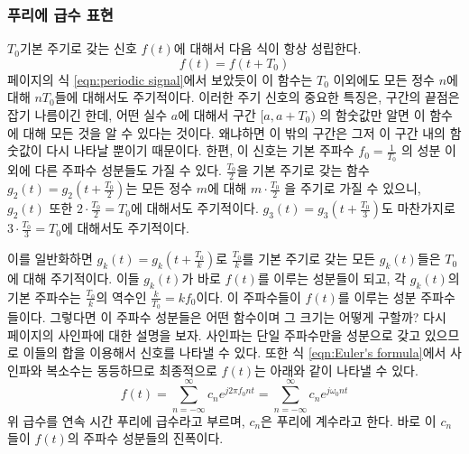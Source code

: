 \subsubsection{푸리에 급수 표현}
$T_0$\를 기본 주기로 갖는 신호 $f(t)$에 대해서 다음 식이 항상 성립한다.
\begin{equation}
    f(t)=f(t+T_0)
\end{equation}
\pageref{eqn:periodic signal} 페이지의 식 \ref{eqn:periodic signal}에서 보았듯이 이 함수는 $T_0$ 이외에도 모든 정수 $n$에 대해 $nT_0$들에 대해서도 주기적이다.
이러한 주기 신호의 중요한 특징은, 구간의 끝점은 잡기 나름이긴 한데, 어떤 실수 $a$에 대해서 구간 $[a,a+T_0)$ 의 함숫값만 알면 이 함수에 대해 모든 것을 알 수 있다는 것이다.
왜냐하면 이 밖의 구간은 그저 이 구간 내의 함숫값이 다시 나타날 뿐이기 때문이다.
한편, 이 신호는 기본 주파수 $f_0=\frac{1}{T_0}$ 의 성분 이외에 다른 주파수 성분들도 가질 수 있다.
$\frac{T_0}{2}$을 기본 주기로 갖는 함수 $g_2(t)=g_2\left(t+\frac{T_0}{2}\right)$는 모든 정수 $m$에 대해 $m\cdot \frac{T_0}{2}$ 을 주기로 가질 수 있으니, $g_2(t)$ 또한 $2\cdot \frac{T_0}{2}=T_0$에 대해서도 주기적이다.
$g_3(t)=g_3\left(t+\frac{T_0}{3}\right)$도 마찬가지로 $3\cdot \frac{T_0}{3}=T_0$에 대해서도 주기적이다.
\par
이를 일반화하면 $g_k(t)=g_k\left(t+\frac{T_0}{k}\right)$로 $\frac{T_0}{k}$를 기본 주기로 갖는 모든 $g_k(t)$들은 $T_0$에 대해 주기적이다.
이들 $g_k(t)$가 바로 $f(t)$를 이루는 성분들이 되고, 각 $g_k(t)$의 기본 주파수는 $\frac{T_0}{k}$의 역수인 $\frac{k}{T_0}=kf_0$이다. 이 주파수들이 $f(t)$를 이루는 성분 주파수들이다.
그렇다면 이 주파수 성분들은 어떤 함수이며 그 크기는 어떻게 구할까? 다시 \pageref{사인파} 페이지의 사인파에 대한 설명을 보자. 사인파는 단일 주파수만을 성분으로 갖고 있으므로 이들의 합을 이용해서 신호를 나타낼 수 있다. 
또한 식 \ref{eqn:Euler's formula}에서 사인파와 복소수는 동등하므로 최종적으로 $f(t)$는 아래와 같이 나타낼 수 있다.
\begin{equation}
    f(t)=\sum_{n=-\infty}^{\infty}c_n e^{j2\pi f_0 nt}=\sum_{n=-\infty}^{\infty}c_n e^{j\omega_0 nt}\label{eqn:fourier series representation}
\end{equation}
위 급수를 연속 시간 푸리에 급수라고 부르며, $c_n$은 푸리에 계수라고 한다. 바로 이 $c_n$들이 $f(t)$의 주파수 성분들의 진폭이다.

